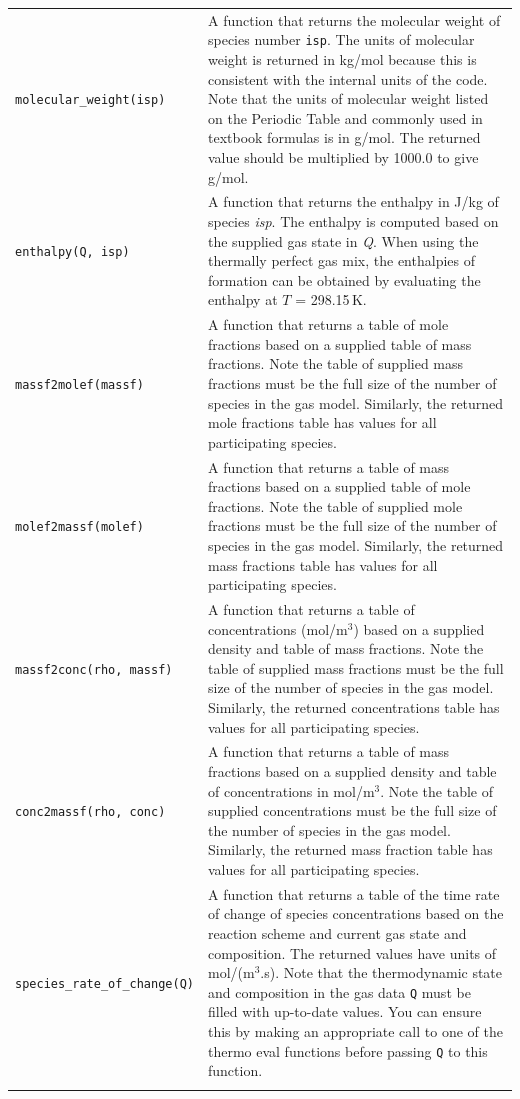 \begin{tabular}{p{5cm}p{9cm}} 
 \noalign{\smallskip} \hline \noalign{\smallskip}
\texttt{molecular\_weight(isp)} & A function that returns
the molecular weight of species number \texttt{isp}. The
units of molecular weight is returned in kg/mol because this
is consistent with the internal units of the code. Note that
the units of molecular weight listed on the Periodic Table
and commonly used in textbook formulas is in g/mol. The returned
value should be multiplied by 1000.0 to give g/mol. \\
\texttt{enthalpy(Q, isp)} & A function that returns
the enthalpy in J/kg of species \textit{isp}.
The enthalpy is computed based on the supplied gas
state in \textit{Q}. When using the thermally perfect
gas mix, the enthalpies of formation can be obtained
by evaluating the enthalpy at $T$ = 298.15\,K. \\
\texttt{massf2molef(massf)} & A function that returns a table
of mole fractions based on a supplied table of mass fractions.
Note the table of supplied mass fractions must be the full size
of the number of species in the gas model. Similarly, the returned
mole fractions table has values for all participating species. \\
\texttt{molef2massf(molef)} & A function that returns a table
of mass fractions based on a supplied table of mole fractions.
Note the table of supplied mole fractions must be the full size
of the number of species in the gas model. Similarly, the returned
mass fractions table has values for all participating species. \\
\texttt{massf2conc(rho, massf)} & A function that returns a table
of concentrations (mol/m$^3$) based on a supplied density and
table of mass fractions.
Note the table of supplied mass fractions must be the full size
of the number of species in the gas model. Similarly, the returned
concentrations table has values for all participating species. \\
\texttt{conc2massf(rho, conc)} & A function that returns a table
of mass fractions based on a supplied density and table of concentrations
in mol/m$^3$.
Note the table of supplied concentrations must be the full size
of the number of species in the gas model. Similarly, the returned
mass fraction table has values for all participating species. \\
\texttt{species\_rate\_of\_change(Q)} & A function that returns
a table of the time rate of change of species concentrations
based on the reaction scheme and current gas state and composition.
The returned values have units of mol/(m$^3$.s).
Note that the thermodynamic state and composition in the
gas data \texttt{Q} must be filled with up-to-date values.
You can ensure this by making an appropriate call to one
of the thermo eval functions before passing \texttt{Q}
to this function. \\
\noalign{\smallskip} \hline \noalign{\smallskip}
\end{tabular}

